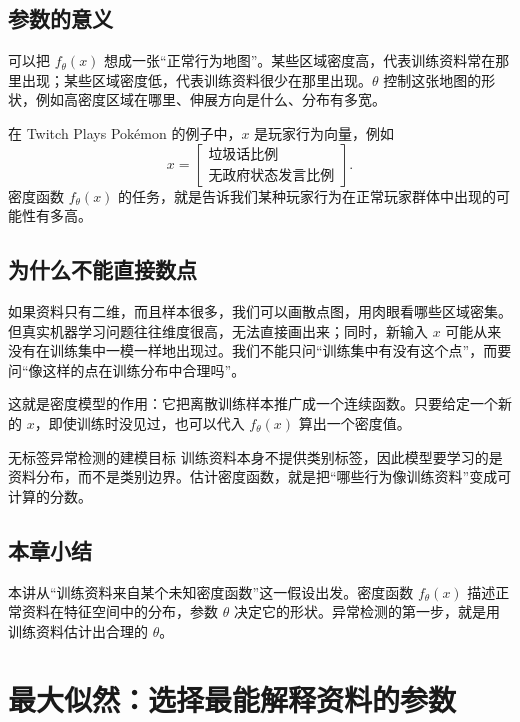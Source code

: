 \documentclass[a4paper]{article}
\begin{document}
\subsection{参数的意义}

可以把 $f_\theta(x)$ 想成一张“正常行为地图”。某些区域密度高，代表训练资料常在那里出现；某些区域密度低，代表训练资料很少在那里出现。$\theta$ 控制这张地图的形状，例如高密度区域在哪里、伸展方向是什么、分布有多宽。

在 Twitch Plays Pokémon 的例子中，$x$ 是玩家行为向量，例如
\[
x=
\begin{bmatrix}
\text{垃圾话比例}\\
\text{无政府状态发言比例}
\end{bmatrix}.
\]
密度函数 $f_\theta(x)$ 的任务，就是告诉我们某种玩家行为在正常玩家群体中出现的可能性有多高。

\subsection{为什么不能直接数点}

如果资料只有二维，而且样本很多，我们可以画散点图，用肉眼看哪些区域密集。但真实机器学习问题往往维度很高，无法直接画出来；同时，新输入 $x$ 可能从来没有在训练集中一模一样地出现过。我们不能只问“训练集中有没有这个点”，而要问“像这样的点在训练分布中合理吗”。

这就是密度模型的作用：它把离散训练样本推广成一个连续函数。只要给定一个新的 $x$，即使训练时没见过，也可以代入 $f_\theta(x)$ 算出一个密度值。

\begin{importantbox}{无标签异常检测的建模目标}
    训练资料本身不提供类别标签，因此模型要学习的是资料分布，而不是类别边界。估计密度函数，就是把“哪些行为像训练资料”变成可计算的分数。
\end{importantbox}

\subsection{本章小结}

本讲从“训练资料来自某个未知密度函数”这一假设出发。密度函数 $f_\theta(x)$ 描述正常资料在特征空间中的分布，参数 $\theta$ 决定它的形状。异常检测的第一步，就是用训练资料估计出合理的 $\theta$。

\section{最大似然：选择最能解释资料的参数}
\end{document}
